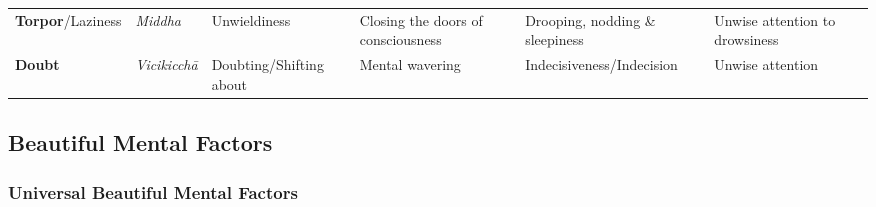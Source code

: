 \documentclass[a4 paper, 12pt]{article}
\begin{document}
\begin{tabular}{P{0.21\textwidth} | C{.13\textwidth} C{.165\textwidth} C{0.165\textwidth} C{0.165\textwidth} C{0.165\textwidth} m{0mm}}
\textbf{Torpor}/\newline Laziness & \textit{Middha} & Unwieldiness & Closing the doors of consciousness & Drooping, nodding \& sleepiness & Unwise attention to drowsiness &\\[9mm]
\textbf{Doubt} & \textit{Vicikicchā} & Doubting/\newline Shifting about & Mental wavering & Indecisiveness/\newline Indecision & Unwise attention &\\[9mm]
\bottomrule
\end{tabular}

\subsection*{Beautiful Mental Factors}

\subsubsection*{Universal Beautiful Mental Factors}
\end{document}
